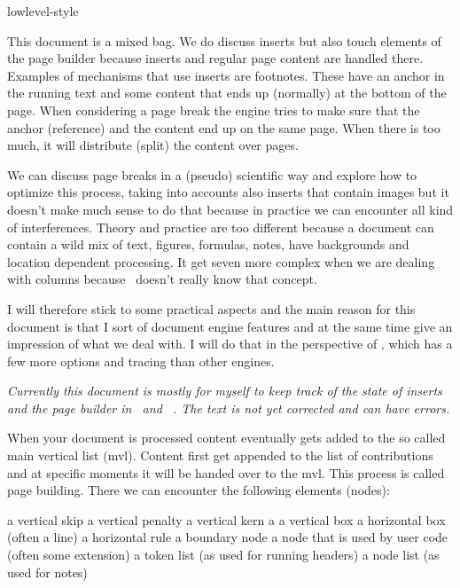 
\environment lowlevel-style

\startdocument
  [title=inserts,
   color=middlecyan]

\startsectionlevel[title=Introduction]

This document is a mixed bag. We do discuss inserts but also touch elements of
the page builder because inserts and regular page content are handled there.
Examples of mechanisms that use inserts are footnotes. These have an anchor in
the running text and some content that ends up (normally) at the bottom of the
page. When considering a page break the engine tries to make sure that the anchor
(reference) and the content end up on the same page. When there is too much, it
will distribute (split) the content over pages.

We can discuss page breaks in a (pseudo) scientific way and explore how to
optimize this process, taking into accounts also inserts that contain images but
it doesn't make much sense to do that because in practice we can encounter all
kind of interferences. Theory and practice are too different because a document
can contain a wild mix of text, figures, formulas, notes, have backgrounds and
location dependent processing. It get seven more complex when we are dealing with
columns because \TEX\ doesn't really know that concept.

I will therefore stick to some practical aspects and the main reason for this
document is that I sort of document engine features and at the same time give an
impression of what we deal with. I will do that in the perspective of
\LUAMETATEX, which has a few more options and tracing than other engines.

{\em Currently this document is mostly for myself to keep track of the state of
inserts and the page builder in \LUAMETATEX\ and \CONTEXT\ \LMTX. The text is not
yet corrected and can have errors.}

\stopsectionlevel

\startsectionlevel[title=The page builder]

When your document is processed content eventually gets added to the so called
main vertical list (mvl). Content first get appended to the list of contributions
and at specific moments it will be handed over to the mvl. This process is called
page building. There we can encounter the following elements (nodes):

\starttabulate
\NC {}     \NC a vertical skip \NC \NR
\NC {}  \NC a vertical penalty \NC \NR
\NC {}     \NC a vertical kern \NC \NR
\NC {}    \NC a a vertical box \NC \NR
\NC {}    \NC a horizontal box (often a line) \NC \NR
\NC {}     \NC a horizontal rule \NC \NR
\NC {} \NC a boundary node \NC \NR
\NC {}  \NC a node that is used by user code (often some extension) \NC \NR
\NC {}     \NC a token list (as used for running headers) \NC \NR
\NC {}   \NC a node list (as used for notes) \NC \NR
\stoptabulate

